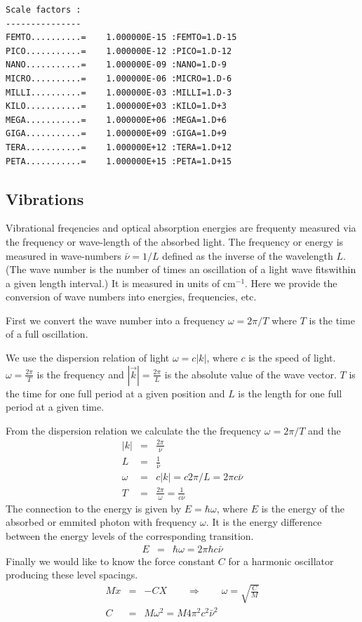 \documentclass[final,12pt]{article}
\begin{document}
{{{\begin{verbatim}
Scale factors :
---------------
FEMTO..........=    1.000000E-15 :FEMTO=1.D-15
PICO...........=    1.000000E-12 :PICO=1.D-12
NANO...........=    1.000000E-09 :NANO=1.D-9
MICRO..........=    1.000000E-06 :MICRO=1.D-6
MILLI..........=    1.000000E-03 :MILLI=1.D-3
KILO...........=    1.000000E+03 :KILO=1.D+3
MEGA...........=    1.000000E+06 :MEGA=1.D+6
GIGA...........=    1.000000E+09 :GIGA=1.D+9
TERA...........=    1.000000E+12 :TERA=1.D+12
PETA...........=    1.000000E+15 :PETA=1.D+15
\end{verbatim}

\newpage
\subsection{Vibrations}

Vibrational freqencies and optical absorption energies are frequenty measured
via the frequency or wave-length of the absorbed light. The frequency or
energy is measured in wave-numbers $\bar{\nu}=1/L$ defined as the inverse
of the wavelength $L$. (The wave number is the number of times an
oscillation of a light wave fitswithin a given length interval.) It is
measured in units of cm$^{-1}$. Here we provide the conversion of wave numbers
into energies, frequencies, etc.


First we convert the wave number into a frequency $\omega=2\pi/T$ where $T$ is
the time of a full oscillation. 

We use the dispersion relation of light $\omega=c|k|$, where $c$ is the speed
of light. $\omega=\frac{2\pi}{T}$ is the frequency and
$|\vec{k}|=\frac{2\pi}{L}$ is the absolute value of the wave vector. $T$ is the
time for one full period at a given position and $L$ is the length for one
full period at a given time.

From the dispersion relation we calculate the 
the frequency $\omega=2\pi/T$ and the 
\begin{eqnarray}
|k|&=&\frac{2\pi}{\bar{\nu}}
\label{eq:kofbarnu}
\\
L&=&\frac{1}{\bar{\nu}}
\label{eq:wavelengthofbarnu}
\\
\omega&=&c|k|=c2\pi/L=2\pi c\bar{\nu}
\label{eq:omegaofbarnu}
\\
T&=&\frac{2\pi}{\omega}=\frac{1}{c\bar{\nu}}
\label{eq:periodofbarnu}
\end{eqnarray}
The connection to the energy is given by $E=\hbar\omega$, where $E$ is the
energy of the absorbed or emmited photon with frequency $\omega$. It is the
energy difference between the energy levels of the corresponding transition.
\begin{eqnarray}
E&=&\hbar\omega=2\pi\hbar c\bar{\nu}
\label{eq:eofomega}
\end{eqnarray}
Finally we would like to know the force constant $C$ for a harmonic oscillator
producing these level spacings. 
\begin{eqnarray}
M\ddot{x}&=&-CX
\qquad\Rightarrow\qquad \omega= \sqrt{\frac{C}{M}}
\nonumber\\
C&=&M\omega^2=M4\pi^2c^2\bar{\nu}^2
\end{eqnarray}

}}}
\end{document}
